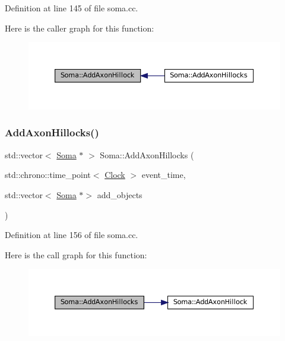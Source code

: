 Definition at line 145 of file soma.\+cc.

Here is the caller graph for this function\+:\nopagebreak
\begin{figure}[H]
\begin{center}
\leavevmode
\includegraphics[width=350pt]{class_soma_a02e0e4656099531b35ab56ad1f7c945a_icgraph}
\end{center}
\end{figure}
\mbox{\label{class_soma_a0fbede6e06b8e24a2cf22878c2f49165}} 
\subsubsection{\texorpdfstring{Add\+Axon\+Hillocks()}{AddAxonHillocks()}}
{\footnotesize\ttfamily std\+::vector$<$ \mbox{\hyperlink{class_soma}{Soma}} $\ast$ $>$ Soma\+::\+Add\+Axon\+Hillocks (\begin{DoxyParamCaption}\item[{std\+::chrono\+::time\+\_\+point$<$ \mbox{\hyperlink{universe_8h_a0ef8d951d1ca5ab3cfaf7ab4c7a6fd80}{Clock}} $>$}]{event\+\_\+time,  }\item[{std\+::vector$<$ \mbox{\hyperlink{class_soma}{Soma}} $\ast$$>$}]{add\+\_\+objects }\end{DoxyParamCaption})}



Definition at line 156 of file soma.\+cc.

Here is the call graph for this function\+:\nopagebreak
\begin{figure}[H]
\begin{center}
\leavevmode
\includegraphics[width=350pt]{class_soma_a0fbede6e06b8e24a2cf22878c2f49165_cgraph}
\end{center}
\end{figure}
\mbox{\label{class_soma_acc198b8ec11c3f2e43d3ba9a16ce84db}} 
